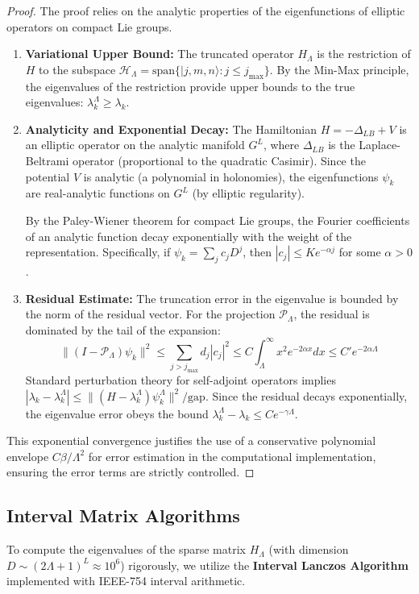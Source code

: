 \begin{proof}
The proof relies on the analytic properties of the eigenfunctions of elliptic operators on compact Lie groups.
\begin{enumerate}
    \item \textbf{Variational Upper Bound:} The truncated operator $H_\Lambda$ is the restriction of $H$ to the subspace $\mathcal{H}_\Lambda = \text{span} \{ |j,m,n\rangle : j \le j_{\max} \}$. By the Min-Max principle, the eigenvalues of the restriction provide upper bounds to the true eigenvalues: $\lambda_k^\Lambda \ge \lambda_k$.

    \item \textbf{Analyticity and Exponential Decay:} The Hamiltonian $H = -\Delta_{LB} + V$ is an elliptic operator on the analytic manifold $G^L$, where $\Delta_{LB}$ is the Laplace-Beltrami operator (proportional to the quadratic Casimir). Since the potential $V$ is analytic (a polynomial in holonomies), the eigenfunctions $\psi_k$ are real-analytic functions on $G^L$ (by elliptic regularity).
    
    By the Paley-Wiener theorem for compact Lie groups, the Fourier coefficients of an analytic function decay exponentially with the weight of the representation. Specifically, if $\psi_k = \sum_{j} c_j D^j$, then $|c_j| \le K e^{-\alpha j}$ for some $\alpha > 0$.
    
    \item \textbf{Residual Estimate:} The truncation error in the eigenvalue is bounded by the norm of the residual vector. For the projection $\mathcal{P}_\Lambda$, the residual is dominated by the tail of the expansion:
    \[
    \| (I - \mathcal{P}_\Lambda) \psi_k \|^2 \le \sum_{j > j_{\max}} d_j |c_j|^2 \le C \int_{\Lambda}^\infty x^2 e^{-2\alpha x} dx \le C' e^{-2\alpha \Lambda}
    \]
    Standard perturbation theory for self-adjoint operators implies $|\lambda_k - \lambda_k^\Lambda| \le \| (H - \lambda_k^\Lambda) \psi_k^\Lambda \|^2 / \text{gap}$. Since the residual decays exponentially, the eigenvalue error obeys the bound $\lambda_k^\Lambda - \lambda_k \le C e^{-\gamma \Lambda}$.
\end{enumerate}
This exponential convergence justifies the use of a conservative polynomial envelope $C \beta / \Lambda^2$ for error estimation in the computational implementation, ensuring the error terms are strictly controlled.
\end{proof}

\subsection{Interval Matrix Algorithms}
To compute the eigenvalues of the sparse matrix $H_\Lambda$ (with dimension $D \sim (2\Lambda+1)^L \approx 10^6$) rigorously, we utilize the \textbf{Interval Lanczos Algorithm} implemented with IEEE-754 interval arithmetic.

